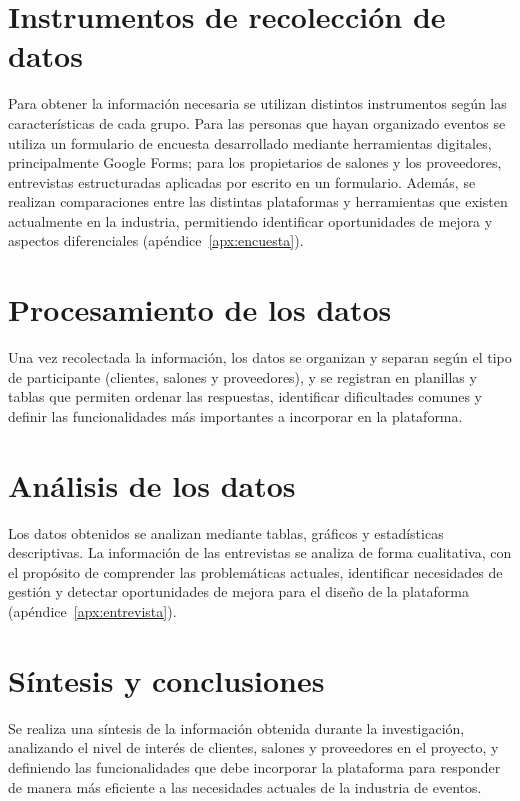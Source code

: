 \section{Instrumentos de recolección de datos}

Para obtener la información necesaria se utilizan distintos instrumentos
según las características de cada grupo. Para las personas que hayan
organizado eventos se utiliza un formulario de encuesta desarrollado
mediante herramientas digitales, principalmente Google Forms; para los
propietarios de salones y los proveedores, entrevistas
estructuradas aplicadas por escrito en un formulario. Además, se
realizan comparaciones entre las
distintas plataformas y herramientas que existen actualmente en la
industria, permitiendo identificar oportunidades de mejora y aspectos
diferenciales (apéndice~\ref{apx:encuesta}).

\section{Procesamiento de los datos}

Una vez recolectada la información, los datos se organizan y separan
según el tipo de participante (clientes, salones y proveedores), y se
registran en planillas y tablas que permiten ordenar las respuestas,
identificar dificultades comunes y definir las funcionalidades más
importantes a incorporar en la plataforma.

\section{Análisis de los datos}

Los datos obtenidos se analizan mediante tablas, gráficos y estadísticas
descriptivas. La información de las entrevistas se analiza de forma
cualitativa, con el propósito de comprender las problemáticas actuales,
identificar necesidades de gestión y detectar oportunidades de mejora
para el diseño de la plataforma (apéndice~\ref{apx:entrevista}).

\section{Síntesis y conclusiones}

Se realiza una síntesis de la información obtenida durante la
investigación, analizando el nivel de interés de clientes, salones y
proveedores en el proyecto, y definiendo las funcionalidades que debe
incorporar la plataforma para responder de manera más eficiente a las
necesidades actuales de la industria de eventos.

